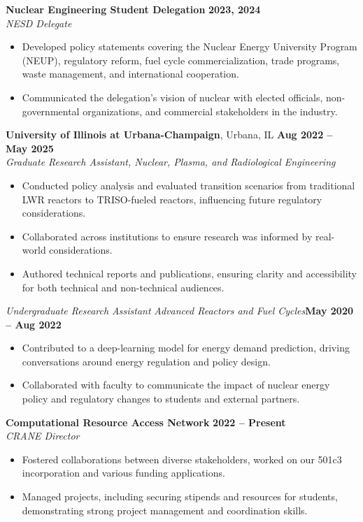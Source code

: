 \documentclass[margin,line]{resume}
\begin{document}
\begin{resume}
    \textbf{Nuclear Engineering Student Delegation} \hfill \textbf{2023, 2024} \\
    \textsl{NESD Delegate} \\
    \begin{itemize}
        \item Developed policy statements covering the Nuclear Energy University Program (NEUP), regulatory reform, fuel cycle commercialization, trade programs, waste management, and international cooperation.
        \item Communicated the delegation's vision of nuclear with elected officials, non-governmental organizations, and commercial stakeholders in the industry.
    \end{itemize}

    \textbf{University of Illinois at Urbana-Champaign}, Urbana, IL \hfill \textbf{Aug 2022 -- May 2025} \\
    \textsl{Graduate Research Assistant, Nuclear, Plasma, and Radiological Engineering} \\
    \begin{itemize}
        \item Conducted policy analysis and evaluated transition scenarios from traditional LWR reactors to TRISO-fueled reactors, influencing future regulatory considerations.
        \item Collaborated across institutions to ensure research was informed by real-world considerations.
        \item Authored technical reports and publications, ensuring clarity and accessibility for both technical and non-technical audiences.
    \end{itemize}

    \textsl{Undergraduate Research Assistant} \textsl{Advanced Reactors and Fuel Cycles}\hfill \textbf{May 2020 -- Aug 2022}\\
    \begin{itemize}
        \item Contributed to a deep-learning model for energy demand prediction, driving conversations around energy regulation and policy design.
        \item Collaborated with faculty to communicate the impact of nuclear energy policy and regulatory changes to students and external partners.
    \end{itemize}

    \textbf{Computational Resource Access Network} \hfill \textbf{2022 -- Present} \\
    \textsl{CRANE Director} \\
    \begin{itemize}
        \item Fostered collaborations between diverse stakeholders, worked on our 501c3 incorporation and various funding applications.
        \item Managed projects, including securing stipends and resources for students, demonstrating strong project management and coordination skills.
    \end{itemize}
    \vspace{-4mm}

\end{resume}
\end{document}
